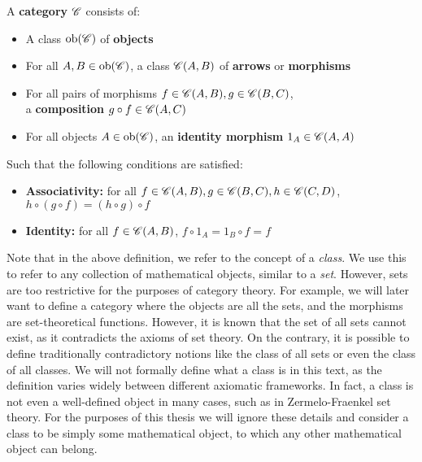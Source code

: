 \documentclass[../thesis.tex]{subfiles}
\begin{document}
\begin{defn}
A \textbf{category} $\mathscr{C}$ consists of:
\begin{itemize}
    \item A class $\operatorname{ob}(\mathscr{C})$ of \textbf{objects}
    \item For all $A,B\in\operatorname{ob}(\mathscr{C})$, a class $\mathscr{C}(A,B)$ of \textbf{arrows} or \textbf{morphisms}
    \item For all pairs of morphisms $f\in \mathscr{C}(A,B), g\in \mathscr{C}(B,C)$,\\a \textbf{composition} $g \circ f \in \mathscr{C}(A,C)$
    \item For all objects $A\in \operatorname{ob}(\mathscr{C})$, an \textbf{identity morphism} $1_A \in \mathscr{C}(A,A)$
\end{itemize}
Such that the following conditions are satisfied:
\begin{itemize}
    \item \textbf{Associativity:} for all $f\in \mathscr{C}(A,B),g\in \mathscr{C}(B,C),h\in \mathscr{C}(C,D)$,\\$h\circ (g\circ f)=(h\circ g)\circ f$
    \item \textbf{Identity:} for all $f\in \mathscr{C}(A,B)$, $f\circ 1_A=1_B\circ f=f$
\end{itemize}
\end{defn}

Note that in the above definition, we refer to the concept of a \textit{class}.
We use this to refer to any collection of mathematical objects, similar to a \textit{set}.
However, sets are too restrictive for the purposes of category theory.
For example, we will later want to define a category where the objects are all the sets, and the morphisms are set-theoretical functions.
However, it is known that the set of all sets cannot exist, as it contradicts the axioms of set theory.
On the contrary, it is possible to define traditionally contradictory notions like the class of all sets or even the class of all classes.
We will not formally define what a class is in this text, as the definition varies widely between different axiomatic frameworks.
In fact, a class is not even a well-defined object in many cases, such as in Zermelo-Fraenkel set theory.
For the purposes of this thesis we will ignore these details and consider a class to be simply some mathematical object, to which any other mathematical object can belong.
\end{document}
